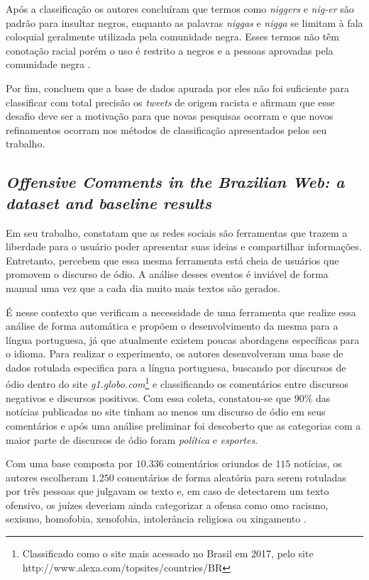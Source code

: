 Após a classificação os autores concluíram que termos como \textit{niggers} e \textit{nig-er} são padrão para insultar negros, enquanto as palavras \textit{niggas} e \textit{nigga} se limitam à fala coloquial geralmente utilizada pela comunidade negra. Esses termos não têm conotação racial porém o uso é restrito a negros e a pessoas aprovadas pela comunidade negra \cite{kwok2013locate}.

Por fim,  concluem que a base de dados apurada por eles não foi suficiente para classificar com total precisão os \textit{tweets} de origem racista e afirmam que esse desafio deve ser a motivação para que novas pesquisas ocorram e que novos refinamentos ocorram nos métodos de classificação apresentados pelos seu trabalho.

\subsection{\textit{Offensive Comments in the Brazilian Web: a dataset and baseline results}}

Em seu trabalho,  constatam que as redes sociais são ferramentas que trazem a liberdade para o usuário poder apresentar suas ideias e compartilhar informações. Entretanto, percebem que essa mesma ferramenta está cheia de usuários que promovem o discurso de ódio. A análise desses eventos é inviável de forma manual uma vez que a cada dia muito mais textos são gerados.

É nesse contexto que  verificam a necessidade de uma ferramenta que realize essa análise de forma automática e propõem o desenvolvimento da mesma para a língua portuguesa, já que atualmente existem poucas abordagens específicas para o idioma. Para realizar o experimento, os autores desenvolveram uma base de dados rotulada especifica para a língua portuguesa, buscando por discursos de ódio dentro do site \textit{g1.globo.com}\footnote{ Classificado como o site mais acessado no Brasil em 2017, pelo site  http://www.alexa.com/topsites/countries/BR} e classificando os comentários entre discursos negativos e discursos positivos. Com essa coleta, constatou-se que $90\%$ das notícias publicadas no site tinham ao menos um discurso de ódio em seus comentários e após uma análise preliminar foi descoberto que as categorias com a maior parte de discursos de ódio foram \textit{política} e \textit{esportes}.

Com uma base composta por $10.336$ comentários oriundos de $115$ notícias, os autores escolheram $1.250$ comentários de forma aleatória para serem rotuladas por três pessoas que julgavam os texto e, em caso de detectarem um texto ofensivo, os juízes deveriam ainda categorizar a ofensa como omo racismo, sexismo, homofobia, xenofobia, intolerância religiosa ou xingamento \cite{Pelle2017}. 

